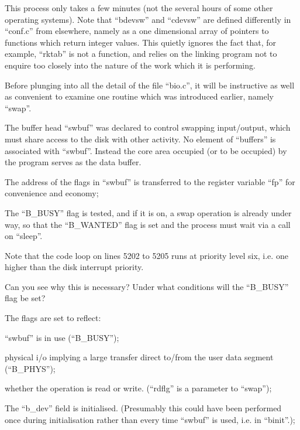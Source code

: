 This process only takes a few minutes
(not the several hours of some other
operating systems). Note that ``bdevsw''
and ``cdevsw'' are defined differently in
``conf.c'' from elsewhere, namely as a
one dimensional array of pointers to
functions which return integer values.
This quietly ignores the fact that, for
example, ``rktab'' is not a function, and
relies on the linking program not to
enquire too closely into the nature of
the work which it is performing.


Before plunging into all the detail of
the file ``bio.c'', it will be instructive as well as convenient to examine
one routine which was introduced earlier, namely ``swap''.

The buffer head ``swbuf'' was declared to
control swapping input/output, which
must share access to the disk with
other activity. No element of ``buffers''
is associated with ``swbuf''. Instead the
core area occupied (or to be occupied)
by the program serves as the data
buffer.

\bd
\item[5200:] The address of the flags in
``swbuf'' is transferred to the
register variable ``fp'' for convenience and economy;

\item[5202:] The ``B\_BUSY'' flag is tested, and
if it is on, a swap operation is
already under way, so that the
``B\_WANTED'' flag is set and the
process must wait via a call on ``sleep''.
\ed

Note that the code loop on lines
5202 to 5205 runs at priority
level six, i.e. one higher than
the disk interrupt priority.

Can you see why this is necessary? Under what conditions will
the ``B\_BUSY'' flag be set?

\bd
\item[5206:] The flags are set to reflect:

\bi
\item ``swbuf'' is in use (``B\_BUSY'');

\item physical i/o implying a large
transfer direct to/from the user
data segment\\
(``B\_PHYS'');

\item whether the operation is read or
write. (``rdflg'' is a parameter to
``swap'');
\ei

\item[5207:] The ``b\_dev'' field is initialised.
(Presumably this could have been
performed once during initialisation rather than every time
``swbuf'' is used, i.e. in ``binit''.);

